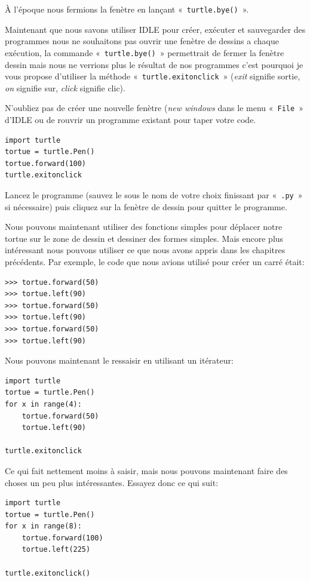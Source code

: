 À l'époque nous fermions la fenètre en lançant «~\texttt{turtle.bye()}~».

Maintenant que nous savons utiliser IDLE pour créer, exécuter et sauvegarder des programmes nous ne souhaitons pas ouvrir une  fenètre de dessins a chaque exécution, la commande «~\texttt{turtle.bye()}~» permettrait de fermer la fenètre dessin mais nous ne verrions plus le résultat de nos programmes c'est pourquoi je vous propose d'utiliser 
la méthode «~\texttt{turtle.exitonclick}~»  (\emph{exit} signifie sortie, \emph{on} signifie sur, \emph{click} signifie clic).

N'oubliez pas de créer une nouvelle fenètre (\emph{new windows} dans le menu «~\texttt{File}~» d'IDLE ou de rouvrir un programme existant pour taper votre code.

\begin{Verbatim}[frame=single,rulecolor=\color{mbleu}, label=à taper]
import turtle
tortue = turtle.Pen()
tortue.forward(100)
turtle.exitonclick
\end{Verbatim}

Lancez le programme (sauvez le sous le nom de votre choix finissant par «~\texttt{.py}~» si nécessaire) puis cliquez sur la fenètre de dessin pour quitter le programme.

Nous pouvons maintenant utiliser des fonctions simples pour déplacer notre tortue sur le zone de dessin et dessiner des formes simples. Mais encore plus intéressant nous pouvons utiliser ce que nous avons appris dans les chapitres précédents. Par exemple, le code que nous avions utilisé pour créer un carré était:

\begin{Verbatim}[frame=single,rulecolor=\color{gray}, label=ne pas saisir]
>>> tortue.forward(50)
>>> tortue.left(90)
>>> tortue.forward(50)
>>> tortue.left(90)
>>> tortue.forward(50)
>>> tortue.left(90)
\end{Verbatim}

Nous pouvons maintenant le ressaisir en utilisant un itérateur:

\begin{Verbatim}[frame=single,rulecolor=\color{mbleu}, label=à taper]
import turtle
tortue = turtle.Pen()
for x in range(4):
    tortue.forward(50)
    tortue.left(90)
    
turtle.exitonclick
\end{Verbatim}

Ce qui fait nettement moins à saisir, mais nous pouvons maintenant faire des choses un peu plus intéressantes. Essayez donc ce qui suit:
\begin{Verbatim}[frame=single,rulecolor=\color{mbleu}, label=à taper]
import turtle
tortue = turtle.Pen()
for x in range(8):
    tortue.forward(100)
    tortue.left(225)
    
turtle.exitonclick()
\end{Verbatim}

